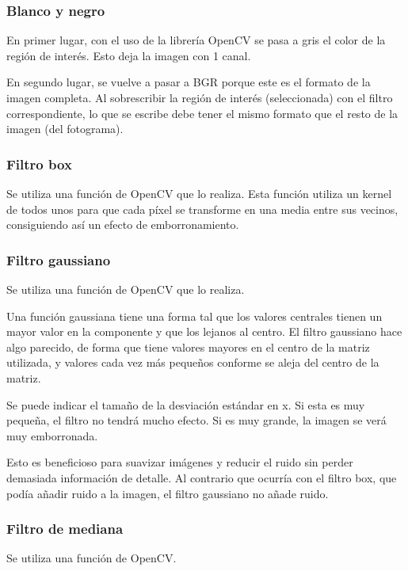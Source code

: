 \documentclass[12pt]{article}
\begin{document}
\subsubsection*{Blanco y negro}

En primer lugar, con el uso de la librería OpenCV se pasa a gris el color de la región de interés. Esto deja la imagen con 1 canal.

En segundo lugar, se vuelve a pasar a BGR porque este es el formato de la imagen completa. Al sobrescribir la región de interés (seleccionada) con el filtro correspondiente, lo que se escribe debe tener el mismo formato que el resto de la imagen (del fotograma).

\subsubsection*{Filtro box}

Se utiliza una función de OpenCV que lo realiza. Esta función utiliza un kernel de todos unos para que cada píxel se transforme en una media entre sus vecinos, consiguiendo así un efecto de emborronamiento.

\subsubsection*{Filtro gaussiano}

Se utiliza una función de OpenCV que lo realiza.

Una función gaussiana tiene una forma tal que los valores centrales tienen un mayor valor en la componente y que los lejanos al centro. El filtro gaussiano hace algo parecido, de forma que tiene valores mayores en el centro de la matriz utilizada, y valores cada vez más pequeños conforme se aleja del centro de la matriz.

Se puede indicar el tamaño de la desviación estándar en x. Si esta es muy pequeña, el filtro no tendrá mucho efecto. Si es muy grande, la imagen se verá muy emborronada.

Esto es beneficioso para suavizar imágenes y reducir el ruido sin perder demasiada información de detalle. Al contrario que ocurría con el filtro box, que podía añadir ruido a la imagen, el filtro gaussiano no añade ruido.

\subsubsection*{Filtro de mediana}

Se utiliza una función de OpenCV.
\end{document}
